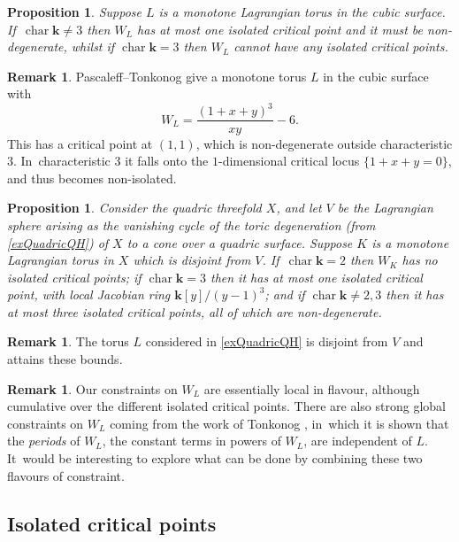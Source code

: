 \documentclass[JEP,XML,SOM,Unicode,NoEqCountersInSection,NoFloatCountersInSection,published]{cedram}
\newtheorem{proposition}[theorem]{Proposition}
\theoremstyle{definition}
\newtheorem{remark}[theorem]{Remark}
\newcommand{\kk}{{\boldsymbol{k}}}
\newcommand{\Char}{\operatorname{char}}
\begin{document}
\begin{proposition}
\label{corCubic}
Suppose $L$ is a monotone Lagrangian torus in the cubic surface. If~$\Char \kk \neq 3$ then $W_L$ has at most one isolated critical point and it must be non-degenerate, whilst if $\Char \kk = 3$ then $W_L$ cannot have any isolated critical points.
\end{proposition}

\begin{remark}
Pascaleff--Tonkonog \cite[Table\,1]{PascaleffTonkonog} give a monotone torus $L$ in the cubic surface with
\[
W_L = \frac{(1+x+y)^3}{xy} - 6.
\]
This has a critical point at $(1, 1)$, which is non-degenerate outside characteristic $3$. In~characteristic $3$ it falls onto the $1$-dimensional critical locus $\{1+x+y = 0\}$, and thus becomes non-isolated.
\end{remark}

\begin{proposition}
\label{corQuadric}
Consider the quadric threefold $X$, and let $V$ be the Lagrangian sphere arising as the vanishing cycle of the toric degeneration (from \cref{exQuadricQH}) of $X$ to a cone over a quadric surface. Suppose $K$ is a monotone Lagrangian torus in $X$ which is disjoint from $V$. If~$\Char \kk = 2$ then $W_K$ has no isolated critical points; if $\Char \kk = 3$ then it has at most one isolated critical point, with local Jacobian ring $\kk[y] / (y-1)^3$; and if $\Char \kk \neq 2, 3$ then it has at most three isolated critical points, all of which are non-degenerate.
\end{proposition}

\begin{remark}
The torus $L$ considered in \cref{exQuadricQH} is disjoint from $V$ and attains these bounds.
\end{remark}

\begin{remark}
Our constraints on $W_L$ are essentially local in flavour, although cumulative over the different isolated critical points. There are also strong global constraints on $W_L$ coming from the work of Tonkonog \cite{TonkonogDescendants}, in~which it is shown that the \emph{periods} of $W_L$, \ie the constant terms in powers of $W_L$, are independent of $L$. It~would be interesting to explore what can be done by combining these two flavours of constraint.
\end{remark}

\subsection{Isolated critical points}
\label{sscIsolated}
\end{document}
